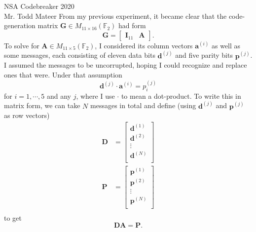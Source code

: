 \documentclass{letter}
\begin{document}
\begin{letter}{NSA Codebreaker 2020\\Mr. Todd Mateer}
From my previous experiment, it became clear that the code-generation matrix
\(\mathbf{G} \in M_{11\times16}(\mathbb{F}_2)\) had form
\[ \mathbf{G} = \begin{bmatrix}\mathbf{I}_{11} & \mathbf{A}\end{bmatrix}. \]
To solve for \(\mathbf{A} \in M_{11\times5}(\mathbb{F}_2)\), I considered its
column vectors \(\mathbf{a}^{(i)}\) as well as some messages, each consisting of
eleven data bits \(\mathbf{d}^{(j)}\) and five parity bits \(\mathbf{p}^{(j)}\).
I assumed the messages to be uncorrupted, hoping I could recognize and replace
ones that were. Under that assumption
\[ \mathbf{d}^{(j)} \cdot \mathbf{a}^{(i)} = p^{(j)}_{i} \]
for \(i=1,\cdots,5\) and any \(j\), where I use \(\cdot\) to mean a dot-product.
To write this in matrix form, we can take \(N\) messages in total and define
(using \(\mathbf{d}^{(j)}\) and \(\mathbf{p}^{(j)}\) as row vectors)
\begin{align*}
    \mathbf{D} &= \begin{bmatrix}\mathbf{d}^{(1)}\\\mathbf{d}^{(2)}\\\vdots\\\mathbf{d}^{(N)}\\\end{bmatrix} \\
    \mathbf{P} &= \begin{bmatrix}\mathbf{p}^{(1)}\\\mathbf{p}^{(2)}\\\vdots\\\mathbf{p}^{(N)}\\\end{bmatrix} \\
\end{align*}
to get
\[ \mathbf{D}\mathbf{A} = \mathbf{P}. \]



\end{letter}
\end{document}

